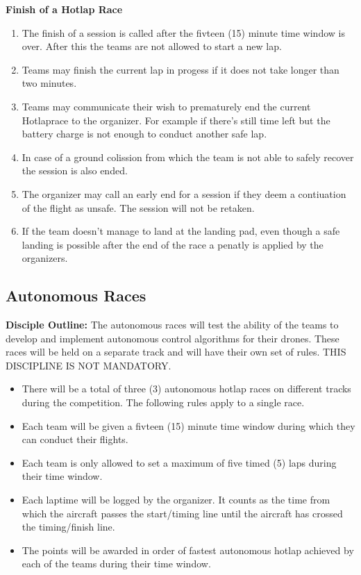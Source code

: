     \textbf{Finish of a Hotlap Race}
    \begin{enumerate}[resume]
      \item The finish of a session is called after the fivteen (15) minute time window is over. After this the teams are not allowed to start a new lap.
      \item Teams may finish the current lap in progess if it does not take longer than two minutes.
      \item Teams may communicate their wish to prematurely end the current Hotlaprace to the organizer. For example if there's still time left but the battery charge is not enough to conduct another safe lap.
      \item In case of a ground colission from which the team is not able to safely recover the session is also ended. 
      \item The organizer may call an early end for a session if they deem a contiuation of the flight as unsafe. The session will not be retaken.  
      \item If the team doesn't manage to land at the landing pad, even though a safe landing is possible after the end of the race a penatly is applied by the organizers.
    \end{enumerate}

 

    \subsection{Autonomous Races}
    \textbf{Disciple Outline: }The autonomous races will test the ability of the teams to develop and implement autonomous control algorithms for their drones. These races will be held on a separate track and will have their own set of rules. THIS DISCIPLINE IS NOT MANDATORY.
 
    
    \begin{itemize}
      \item There will be a total of three (3) autonomous hotlap races on different tracks during the competition. The following rules apply to a single race.
      \item Each team will be given a fivteen (15) minute time window during which they can conduct their flights. 
      \item Each team is only allowed to set a maximum of five timed (5) laps during their time window. 
      \item Each laptime will be logged by the organizer. It counts as the time from which the aircraft passes the start/timing line until the aircraft has crossed the timing/finish line. 
      \item The points will be awarded in order of fastest autonomous hotlap achieved by each of the teams during their time window.
    \end{itemize}


